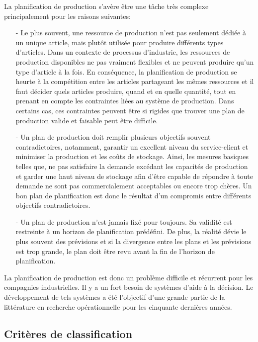 \documentclass[12pt,a4paper]{article}
\begin{document}
 La planification de production s'avère être une tâche très complexe principalement pour les raisons suivantes:
 \begin{itemize}
 	\item[-] Le plus souvent, une ressource de production n'est pas seulement dédiée à un unique article, mais plutôt utilisée pour produire différents types d'articles. Dans un contexte de processus d'industrie, les ressources de production disponibles ne pas vraiment flexibles et ne peuvent produire qu'un type d'article à la fois. En conséquence, la planification de production se heurte à la compétition entre les articles partageant les mêmes ressources et il faut décider quels articles produire, quand et en quelle quantité, tout en prenant en compte les contraintes liées au système de production. Dans certains cas, ces contraintes peuvent être si rigides que trouver une plan de production valide et faisable peut être difficile.
 	
 	\item[-] Un plan de production doit remplir plusieurs objectifs souvent contradictoires, notamment, garantir un excellent niveau du service-client et minimiser la production et les coûts de stockage. Ainsi, les mesures basiques telles que, ne pas satisfaire la demande excédant les capacités de production et garder une haut niveau de stockage afin d'être capable de répondre à toute demande ne sont pas commercialement acceptables ou encore trop chères. Un bon plan de planification est donc le résultat d'un compromis entre différents objectifs contradictoires.
 	
 	\item[-] Un plan de production n'est jamais fixé pour toujours. Sa validité est restreinte à un horizon de planification prédéfini. De plus, la réalité dévie le plus souvent des prévisions et si la divergence entre les plans et les prévisions est trop grande, le plan doit être revu avant la fin de l'horizon de planification.
 \end{itemize}
 
 La planification de production est donc un problème difficile et récurrent pour les compagnies industrielles. Il y a un fort besoin de systèmes d'aide à la décision. Le développement de tels systèmes a été l'objectif d'une grande partie de la littérature en recherche opérationnelle pour les cinquante dernières années. 
	
\subsection{Critères de classification}
\end{document}
